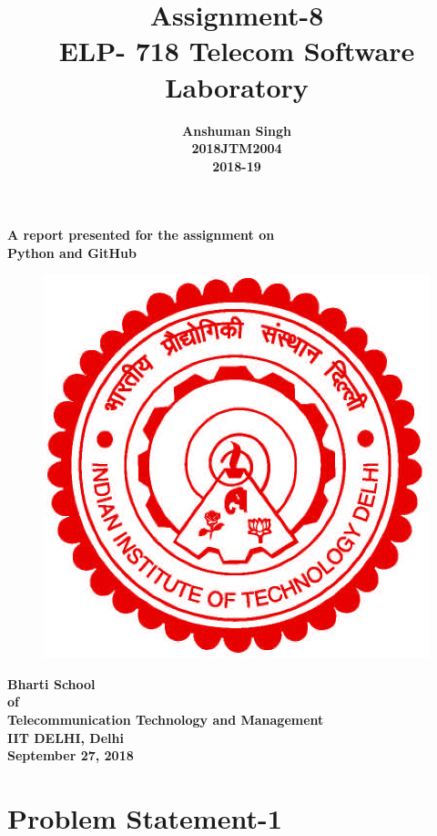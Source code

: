 \documentclass[12pt]{article}
\author{\textbf{Anshuman Singh} \\ \textbf{2018JTM2004}\\ \textbf{2018-19}}
\date{}
\title{\textbf{Assignment-8\\ELP- 718 Telecom Software Laboratory}}
\begin{document}
	\maketitle
	
	\begin{center}
	\noindent \textbf{A report presented for the assignment on\\Python and GitHub }
	\vspace{1cm}
	
	\begin{figure}[h]
	\centering
	\includegraphics[scale=.2]{iitd.jpg}
	
	
	\end{figure}
	\vspace{1.5cm}
	
	\textbf{Bharti School\\of\\Telecommunication Technology and Management\\IIT DELHI, Delhi\\September 27, 2018}
	
	\end{center}
	
	\newpage
	\tableofcontents
	\listoffigures
	\newpage
	
	\section{Problem Statement-1}
	
\end{document}
